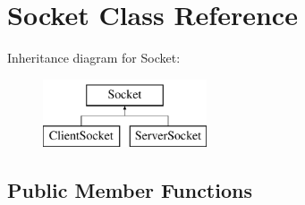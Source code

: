 \hypertarget{classSocket}{\section{Socket Class Reference}
\label{classSocket}
}
Inheritance diagram for Socket\-:\begin{figure}[H]
\begin{center}
\leavevmode
\includegraphics[height=2.000000cm]{classSocket}
\end{center}
\end{figure}
\subsection*{Public Member Functions}
